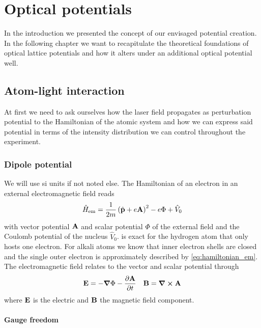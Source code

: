 \chapter{Optical potentials}

In the introduction we presented the concept of our envisaged potential
creation. In the following chapter we want to recapitulate the theoretical
foundations of optical lattice potentials and how it alters under an
additional optical potential well.

\section{Atom-light interaction}

At first we need to ask ourselves how the laser field propagates as
perturbation potential to the Hamiltonian of the atomic system and how we can
express said potential in terms of the intensity distribution we can control
throughout the experiment.

\subsection{Dipole potential}

We will use \gls{si} units if not noted else. The Hamiltonian of an electron
in an external electromagnetic field reads
\begin{equation}
  \hat{H}_\text{em}
  =\frac{1}{2m}\left(\hat{\vb{p}}+e\vb{A}\right)^2-e\Phi+\hat{V}_0
  \label{eq:hamiltonian_em}
\end{equation}
with vector potential $\vb{A}$ and scalar potential $\Phi$ of the external
field and the Coulomb potential of the nucleus $\hat{V}_0$.
 is exact for the hydrogen atom that only hosts one
electron. For alkali atoms we know that inner electron shells are closed and
the single outer electron is approximately described by
\cref{eq:hamiltonian_em}. The electromagnetic field relates to the
vector and scalar potential through
\begin{align}
  \vb{E}=-\grad{\Phi}-\pdv{\vb{A}}{t} &&
  \vb{B}=\curl{\vb{A}}
  \label{eq:field_em_potentials}
\end{align}
where $\vb{E}$ is the electric and $\vb{B}$ the magnetic field component.

\subsubsection{Gauge freedom}

